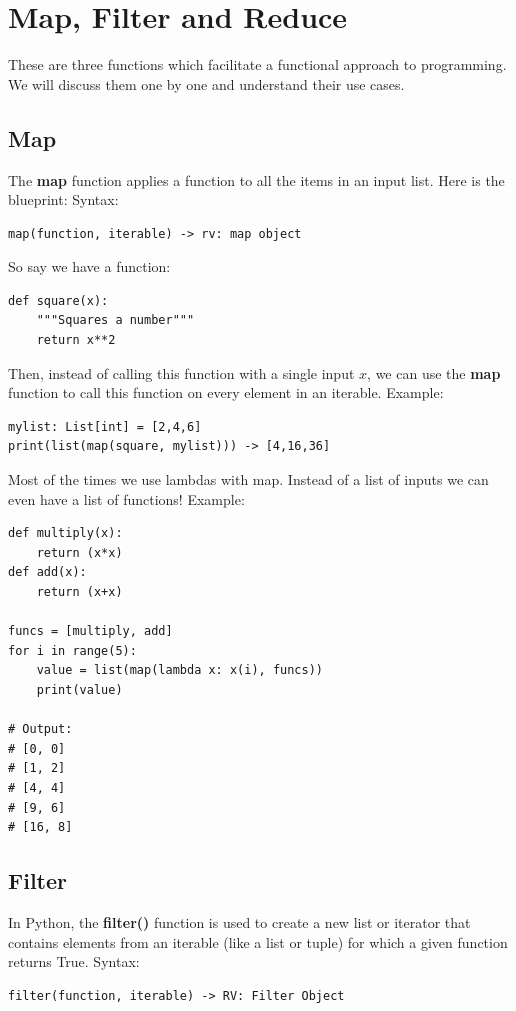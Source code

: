 \documentclass{report}
\begin{document}
    \pagebreak \bigbreak \noindent
    \section{Map, Filter and Reduce}
    \bigbreak \noindent
    These are three functions which facilitate a functional approach to programming. We will discuss them one by one and understand their use cases.

    \subsection{Map}
    \bigbreak \noindent
    The \textbf{map} function applies a function to all the items in an input list. Here is the blueprint:
    \bigbreak \noindent 
    Syntax:
    \begin{verbatim}
map(function, iterable) -> rv: map object
    \end{verbatim}

    So say we have a function:
    \begin{verbatim}
def square(x):
    """Squares a number"""
    return x**2
    \end{verbatim}
    Then, instead of calling this function with a single input $x$, we can use the \textbf{map} function to call this function on every element in an iterable.
    \bigbreak \noindent 
    Example:
    \begin{verbatim}
mylist: List[int] = [2,4,6]
print(list(map(square, mylist))) -> [4,16,36]
    \end{verbatim}

    \bigbreak \noindent 
    Most of the times we use lambdas with map. Instead of a list of inputs we can even have a list of functions!
    \bigbreak \noindent
    Example:
    \begin{verbatim}
def multiply(x):
    return (x*x)
def add(x):
    return (x+x)

funcs = [multiply, add]
for i in range(5):
    value = list(map(lambda x: x(i), funcs))
    print(value)

# Output:
# [0, 0]
# [1, 2]
# [4, 4]
# [9, 6]
# [16, 8]
    \end{verbatim}


    \pagebreak \bigbreak \noindent
    \subsection{Filter}
    \bigbreak \noindent
    In Python, the \textbf{filter()} function is used to create a new list or iterator that contains elements from an iterable (like a list or tuple) for which a given function returns True.
    \bigbreak \noindent 
    Syntax:
    \begin{verbatim}
filter(function, iterable) -> RV: Filter Object
    \end{verbatim}
\end{document}
